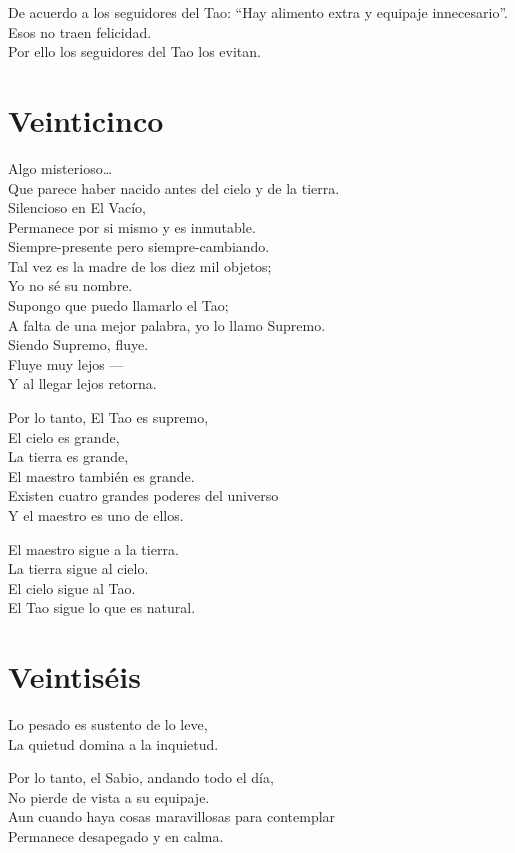 \documentclass[hidelinks]{memoir}
\begin{document}
	De acuerdo a los seguidores del Tao: ``Hay alimento extra y equipaje
	innecesario''.\\
	Esos no traen felicidad.\\
	Por ello los seguidores del Tao los evitan.
	
	\chapter*{Veinticinco}
	
	Algo misterioso\ldots{}\\
	Que parece haber nacido antes del cielo y de la tierra.\\
	Silencioso en El Vacío,\\
	Permanece por si mismo y es inmutable.\\
	Siempre-presente pero siempre-cambiando.\\
	Tal vez es la madre de los diez mil objetos;\\
	Yo no sé su nombre.\\
	Supongo que puedo llamarlo el Tao;\\
	A falta de una mejor palabra, yo lo llamo Supremo.\\
	Siendo Supremo, fluye.\\
	Fluye muy lejos ---\\
	Y al llegar lejos retorna.
	
	Por lo tanto, El Tao es supremo,\\
	El cielo es grande,\\
	La tierra es grande,\\
	El maestro también es grande.\\
	Existen cuatro grandes poderes del universo\\
	Y el maestro es uno de ellos.
	
	El maestro sigue a la tierra.\\
	La tierra sigue al cielo.\\
	El cielo sigue al Tao.\\
	El Tao sigue lo que es natural.
	
	\chapter*{Veintiséis}
	
	Lo pesado es sustento de lo leve,\\
	La quietud domina a la inquietud.
	
	Por lo tanto, el Sabio, andando todo el día,\\
	No pierde de vista a su equipaje.\\
	Aun cuando haya cosas maravillosas para contemplar\\
	Permanece desapegado y en calma.
	
\end{document}
